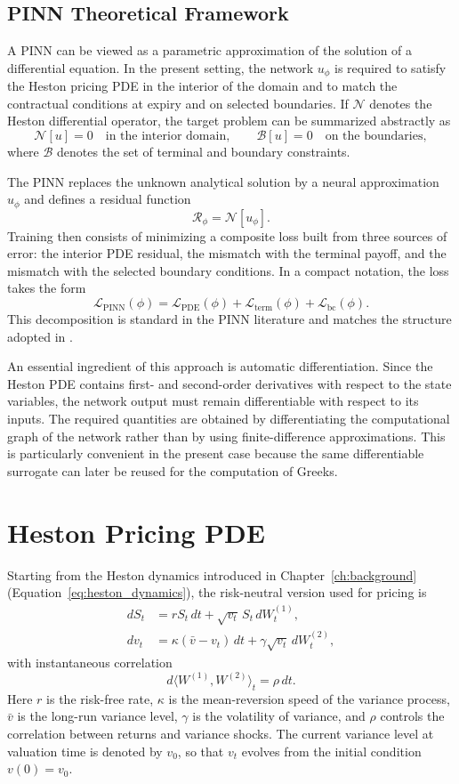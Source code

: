 \subsection{PINN Theoretical Framework}

A PINN can be viewed as a parametric approximation of the solution of a differential equation. In the present setting, the network $u_\phi$ is required to satisfy the Heston pricing PDE in the interior of the domain and to match the contractual conditions at expiry and on selected boundaries. If $\mathcal{N}$ denotes the Heston differential operator, the target problem can be summarized abstractly as
\[
\mathcal{N}[u]=0 \quad \text{in the interior domain}, \qquad
\mathcal{B}[u]=0 \quad \text{on the boundaries},
\]
where $\mathcal{B}$ denotes the set of terminal and boundary constraints.

The PINN replaces the unknown analytical solution by a neural approximation $u_\phi$ and defines a residual function
\[
\mathcal{R}_\phi = \mathcal{N}[u_\phi].
\]
Training then consists of minimizing a composite loss built from three sources of error: the interior PDE residual, the mismatch with the terminal payoff, and the mismatch with the selected boundary conditions. In a compact notation, the loss takes the form
\[
\mathcal{L}_{\mathrm{PINN}}(\phi)=
\mathcal{L}_{\mathrm{PDE}}(\phi)+
\mathcal{L}_{\mathrm{term}}(\phi)+
\mathcal{L}_{\mathrm{bc}}(\phi).
\]
This decomposition is standard in the PINN literature and matches the structure adopted in \cite{hainaut2024pinn}.

An essential ingredient of this approach is automatic differentiation. Since the Heston PDE contains first- and second-order derivatives with respect to the state variables, the network output must remain differentiable with respect to its inputs. The required quantities are obtained by differentiating the computational graph of the network rather than by using finite-difference approximations. This is particularly convenient in the present case because the same differentiable surrogate can later be reused for the computation of Greeks.
\section{Heston Pricing PDE}

Starting from the Heston dynamics introduced in Chapter~\ref{ch:background} (Equation~\ref{eq:heston_dynamics}), the risk-neutral version used for pricing is
\begin{align}
    dS_t &= rS_t\,dt + \sqrt{v_t}\,S_t\,dW_t^{(1)}, \\
    dv_t &= \kappa(\bar v-v_t)\,dt + \gamma\sqrt{v_t}\,dW_t^{(2)},
\end{align}
with instantaneous correlation
\[
d\langle W^{(1)},W^{(2)}\rangle_t = \rho\,dt.
\]
Here $r$ is the risk-free rate, $\kappa$ is the mean-reversion speed of the variance process, $\bar v$ is the long-run variance level, $\gamma$ is the volatility of variance, and $\rho$ controls the correlation between returns and variance shocks. The current variance level at valuation time is denoted by $v_0$, so that $v_t$ evolves from the initial condition $v(0)=v_0$.

